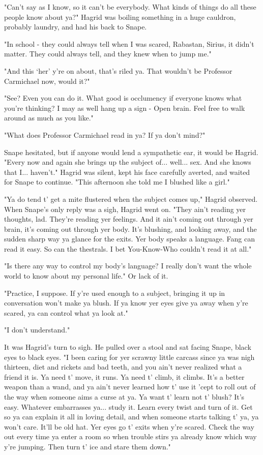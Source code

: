 "Can't say as I know, so it can't be everybody. What kinds of things do all these people know about ya?" Hagrid was boiling something in a huge cauldron, probably laundry, and had his back to Snape.

"In school - they could always tell when I was scared, Rabastan, Sirius, it didn't matter. They could always tell, and they knew when to jump me."

"And this `her' y're on about, that's riled ya. That wouldn't be Professor Carmichael now, would it?"

"See? Even you can do it. What good is occlumency if everyone knows what you're thinking? I may as well hang up a sign - Open brain. Feel free to walk around as much as you like."

"What does Professor Carmichael read in ya? If ya don't mind?"

Snape hesitated, but if anyone would lend a sympathetic ear, it would be Hagrid. "Every now and again she brings up the subject of... well... sex. And she knows that I... haven't." Hagrid was silent, kept his face carefully averted, and waited for Snape to continue. "This afternoon she told me I blushed like a girl."

"Ya do tend t' get a mite flustered when the subject comes up," Hagrid observed. When Snape's only reply was a sigh, Hagrid went on. "They ain't reading yer thoughts, lad. They're reading yer feelings. And it ain't coming out through yer brain, it's coming out through yer body. It's blushing, and looking away, and the sudden sharp way ya glance for the exits. Yer body speaks a language. Fang can read it easy. So can the thestrals. I bet You-Know-Who couldn't read it at all."

"Is there any way to control my body's language? I really don't want the whole world to know about my personal life." Or lack of it.

"Practice, I suppose. If y're used enough to a subject, bringing it up in conversation won't make ya blush. If ya know yer eyes give ya away when y're scared, ya can control what ya look at."

"I don't understand."

It was Hagrid's turn to sigh. He pulled over a stool and sat facing Snape, black eyes to black eyes. "I been caring for yer scrawny little carcass since ya was nigh thirteen, diet and rickets and bad teeth, and you ain't never realized what a friend it is. Ya need t' move, it runs. Ya need t' climb, it climbs. It's a better weapon than a wand, and ya ain't never learned how t' use it 'cept to roll out of the way when someone aims a curse at ya. Ya want t' learn not t' blush? It's easy. Whatever embarrasses ya... study it. Learn every twist and turn of it. Get so ya can explain it all in loving detail, and when someone starts talking t' ya, ya won't care. It'll be old hat. Yer eyes go t' exits when y're scared. Check the way out every time ya enter a room so when trouble stirs ya already know which way y're jumping. Then turn t' ice and stare them down."


